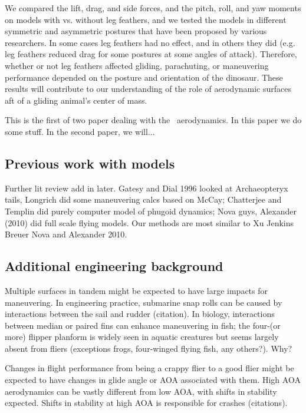 We compared the lift, drag, and side forces, and the pitch, roll, and yaw moments on models with vs. without leg feathers, and we tested the models in different symmetric and asymmetric postures that have been proposed by various researchers.  In some cases leg feathers had no effect, and in others they did (e.g. leg feathers reduced drag for some postures at some angles of attack). Therefore, whether or not leg feathers affected gliding, parachuting, or maneuvering performance depended on the posture and orientation of the dinosaur.  These results will contribute to our understanding of the role of aerodynamic surfaces aft of a gliding animal's center of mass.

This is the first of two paper dealing with the \Mgui\ aerodynamics.  In this paper we do some stuff.  In the second paper, we will...

\subsection{Previous work with models}

Further lit review add in later.  Gatesy and Dial 1996 looked at Archaeopteryx tails, Longrich did some maneuvering calcs based on McCay; Chatterjee and Templin did purely computer model of phugoid dynamics; Nova guys, Alexander (2010) did full scale flying models.  Our methods are most similar to Xu Jenkins Breuer Nova and Alexander 2010.  

\subsection{Additional engineering background}

Multiple surfaces in tandem might be expected to have large impacts for maneuvering.  In engineering practice, submarine snap rolls can be caused by interactions between the sail and rudder (citation).  In biology, interactions between median or paired fins can enhance maneuvering in fish; the four-(or more) flipper planform is widely seen in aquatic creatures but seems largely absent from fliers (exceptions frogs, four-winged flying fish, any others?). Why?  

Changes in flight performance from being a crappy flier to a good flier might be expected to have changes in glide angle or AOA associated with them.  High AOA aerodynamics can be vastly different from low AOA, with shifts in stability expected.  Shifts in stability at high AOA is responsible for crashes (citations). 

